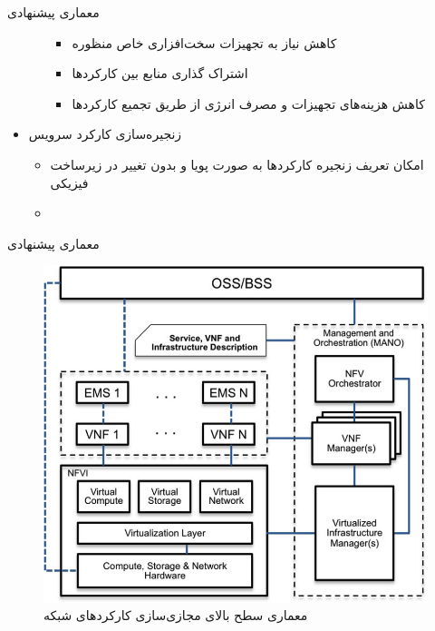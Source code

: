 \documentclass{beamer}
\makeatletter
\newcommand{\RTList}{\raggedleft\rightskip\@totalleftmargin}
\makeatother
\begin{document}
\begin{persian}
\begin{frame}{معماری پیشنهادی}
\begin{itemize}
\begin{itemize}
            \begin{itemize}\RTList{}
                \item کاهش نیاز به تجهیزات سخت‌افزاری خاص منظوره
                \item اشتراک گذاری منابع بین کارکرد‌ها
                \item کاهش هزینه‌های تجهیزات و مصرف انرژی از طریق تجمیع کارکردها
            \end{itemize}
        \end{itemize}
        \item زنجیره‌سازی کارکرد سرویس
        \begin{itemize}\RTList{}
            \item امکان تعریف زنجیره کارکردها به صورت پویا و بدون تغییر در زیرساخت فیزیکی
            \item {}
        \end{itemize}
    \end{itemize}
\end{frame}
\begin{frame}{معماری پیشنهادی}
    \begin{center}\begin{figure}
        \includegraphics[scale=0.5]{images/nfv-arch.png}
        \caption{معماری سطح بالای مجازی‌سازی کارکردهای شبکه}
    \end{figure}\end{center}

\end{frame}
\end{persian}
\end{document}
